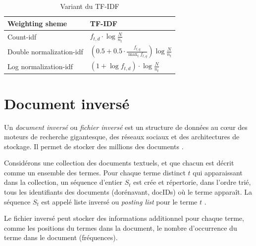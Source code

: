 \begin{table}[htbp]
    \centering
    \renewcommand{\arraystretch}{1.5} %
    \begin{tabularx}{\textwidth}{|X|X|}
        \hline
        \textbf{Weighting sheme} & \textbf{TF-IDF} \\
        \hline
        Count-idf & $ f_{t,d} \cdot \log{\frac{N}{n_{t}}} $ \\
        \hline
        Double normalization-idf & $ \left( 0.5 + 0.5 \cdot \frac{f_{t,q}}{\max_{t} f_{t,q}} \right) \log{\frac{N}{n_{t}}} $ \\
        \hline
        Log normalization-idf & $ (1 + \log{f_{t,d}}) \cdot \log{\frac{N}{n_{t}}} $ \\
        \hline
    \end{tabularx}
    \caption{Variant du TF-IDF \citep{sarch-engine-vsm}}\label{tab:variant-tf-idf}
\end{table}

\section{Document inversé}
Un \emph{document inversé} ou \emph{fichier inversé} est un structure de données au cœur des moteurs de recherche gigantesque, des réseaux sociaux et des architectures de stockage. Il permet de stocker des millions des documents \citep{techniques-compression-inverted-index}.

\begin{definition}
    Considérons une collection des documents textuels, et que chacun est décrit comme un ensemble des termes. Pour chaque terme distinct $t$ qui apparaissant dans la collection, un séquence d'entier $S_{t}$ est crée et répertorie, dans l'ordre trié, tous les identifiants des documents (dorénavant, docIDs) où le terme apparaît. La séquence $S_{t}$ est appelé liste inversé ou \emph{posting list} pour le terme $t$ \citep{techniques-compression-inverted-index}.
\end{definition}

Le fichier inversé peut stocker des informations additionnel pour chaque terme, comme les positions du termes dans la document, le nombre d’occurrence du terme dans le document (fréquences).

